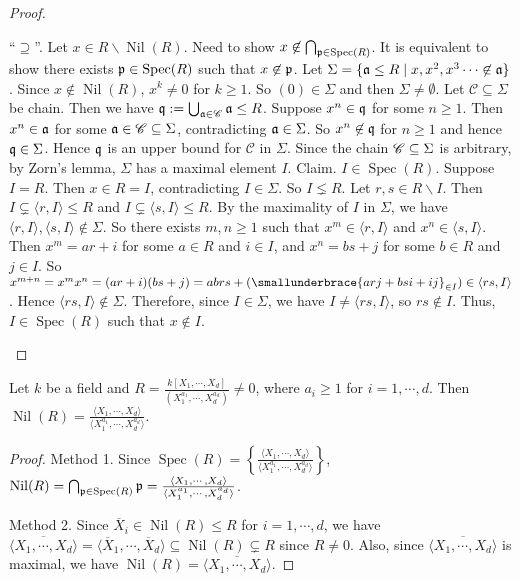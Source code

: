 \begin{proof}
\begin{enumerate}
            ``$\supseteq$''. Let $x \in R \smallsetminus \operatorname{Nil}(R)$. Need to show $x \not \in \bigcap_{\mathfrak{p} \in \operatorname{Spec}(R)}$. It is equivalent to show there exists $\mathfrak{p} \in \operatorname{Spec}(R)$ such that $x \not \in \mathfrak{p}$. Let $\Sigma = \{\mathfrak{a} \leq R \mid x,x^2,x^3 \cdots \not \in \mathfrak{a}\}$. Since $x \not \in \operatorname{Nil}(R)$, $x^k \neq 0$ for $k \geq 1$. So $(0) \in \Sigma$ and then $\Sigma \neq \emptyset$. Let $\mathscr C \subseteq \Sigma$ be chain. Then we have $\mathfrak{q} := \bigcup_{\mathfrak{a} \in \mathscr C} \mathfrak{a} \leq R$. Suppose $x^n \in \mathfrak{q}$ for some $n \geq 1$. Then $x^n \in \mathfrak{a}$ for some $\mathfrak{a} \in \mathscr C \subseteq \Sigma$, contradicting $\mathfrak{a} \in \Sigma$. So $x^n \not \in \mathfrak{q}$ for $n \geq 1$ and hence $\mathfrak{q} \in \Sigma$. Hence $\mathfrak{q}$ is an upper bound for $\mathscr C$ in $\Sigma$. Since the chain $\mathscr{C} \subseteq \Sigma$ is arbitrary, by Zorn's lemma, $\Sigma$ has a maximal element $I$. Claim. $I \in \operatorname{Spec}(R)$. Suppose $I = R$. Then $x \in R = I$, contradicting $I \in \Sigma$. So $I \lneq R$. Let $r,s \in R \smallsetminus I$. Then $I \subsetneq \langle r,I \rangle \leq R$ and $I \subsetneq \langle s,I \rangle \leq R$. By the maximality of $I$ in $\Sigma$, we have $\langle r,I \rangle, \langle s,I \rangle \not \in \Sigma$. So there exists $m,n \geq 1$ such that $x^m \in \langle r,I \rangle$ and $x^n \in \langle s,I \rangle$. Then $x^m = ar+i$ for some $a \in R$ and $i \in I$, and $x^n = bs + j$ for some $b \in R$ and $j \in I$. So $x^{m+n} = x^m x^n = (ar+i)(bs+j) = abrs + (\smallunderbrace{arj+bsi+ij}_{\in I}) \in \langle rs,I \rangle$. Hence $\langle rs, I \rangle \not\in \Sigma$. Therefore, since $I \in \Sigma$, we have $I \neq \langle rs,I \rangle$, so $rs \not \in I$. Thus, $I \in \operatorname{Spec}(R)$ such that $x \not \in I$. \qedhere
    \end{enumerate}
\end{proof}

\begin{example*}
    Let $k$ be a field and $R = \frac{k[X_1,\cdots,X_d]}{(X_1^{a_1},\cdots,X_d^{a_d})} \neq 0$, where $a_i \geq 1$ for $i = 1,\cdots,d$. Then $\operatorname{Nil}(R) = \frac{\langle X_1,\cdots,X_d \rangle}{\langle X_1^{a_1},\cdots,X_d^{a_d} \rangle}$.
\end{example*}

\begin{proof}
    Method 1. Since $\operatorname{Spec}(R) = \left\{\frac{\langle X_1,\cdots,X_d \rangle}{\langle X_1^{a_1},\cdots,X_d^{a_d} \rangle}\right\}$, $\operatorname{Nil}(R) = \bigcap_{\mathfrak{p} \in \operatorname{Spec}(R)} \mathfrak{p} =  \frac{\langle X_1,\cdots,X_d \rangle}{\langle X_1^{a_1},\cdots,X_d^{a_d} \rangle}$. \par
    Method 2. Since $\overbar X_i \in \operatorname{Nil}(R) \leq R$ for $i = 1,\cdots,d$, we have $\overbar {\langle X_1,\cdots,X_d \rangle} = \langle \overbar X_1,\cdots,\overbar X_d \rangle \subseteq \operatorname{Nil}(R) \subsetneq R$ since $R \neq 0$. Also, since $\overbar {\langle X_1,\cdots,X_d \rangle}$ is maximal, we have $\operatorname{Nil}(R) = \overbar {\langle X_1,\cdots,X_d \rangle}$.
\end{proof}

